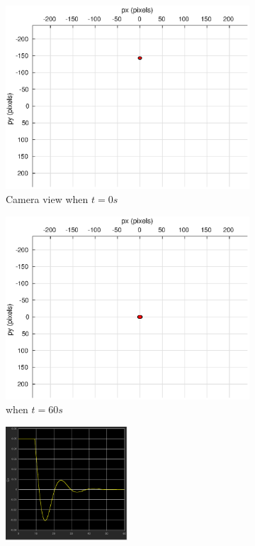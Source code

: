 \begin{figure}
\begin{subfigure}[b]{0.45\linewidth}
		\includegraphics[width=\textwidth]{images/chapter4/inertial_camera_0mps}
		\caption{Camera view when $t=0s$}
	\end{subfigure}
	\begin{subfigure}[b]{0.45\linewidth}
		\includegraphics[width=\textwidth]{images/chapter4/inertial_camera_0mps_60s}
		\caption{when $t=60s$}
	\end{subfigure}
	\begin{subfigure}[b]{0.8\linewidth}
		\centering
		\includegraphics[width=0.5\textwidth]{images/chapter4/inertial_Ex_0mps}

\end{subfigure}
\end{figure}
